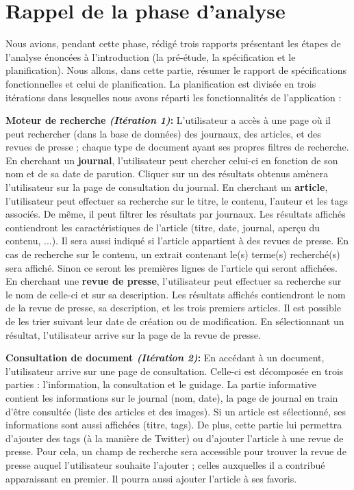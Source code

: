 \section{Rappel de la phase d'analyse}
\label{sec:rappel}

	Nous avions, pendant cette phase, rédigé trois rapports présentant les étapes de l'analyse énoncées à l'introduction (la pré-étude\cite{Pretude}, la spécification\cite{Specs} et le planification\cite{Planif}). Nous allons, dans cette partie, résumer le rapport de spécifications fonctionnelles et celui de planification. La planification est  divisée en trois itérations dans lesquelles nous avons réparti les fonctionnalités de l'application : 

	\textbf{Moteur de recherche \textit{(Itération 1)}:} L'utilisateur a accès à une page où il peut rechercher (dans la base de données) des journaux, des articles, et des revues de presse ; chaque type de document ayant ses propres filtres de recherche. 
	En cherchant un \textbf{journal}, l'utilisateur peut chercher celui-ci en fonction de son nom et de sa date de parution. Cliquer sur un des résultats obtenus amènera l'utilisateur sur la page de consultation du journal. 
	En cherchant un \textbf{article}, l'utilisateur peut effectuer sa recherche sur le titre, le contenu, l'auteur et les tags associés. De même, il peut filtrer les résultats par journaux. Les résultats affichés contiendront les caractéristiques de l'article (titre, date, journal, aperçu du contenu, ...). Il sera aussi indiqué si l'article appartient à des revues de presse. 
	En cas de recherche sur le contenu, un extrait contenant le(s) terme(s) recherché(s) sera affiché. Sinon ce seront les premières lignes de l'article qui seront affichées. En cherchant une \textbf{revue de presse}, l'utilisateur peut effectuer sa recherche sur le nom de celle-ci et sur sa description. Les résultats affichés contiendront le nom de la revue de presse, sa description, et les trois premiers articles. Il est possible de les trier suivant leur date de création ou de modification. En sélectionnant un résultat, l'utilisateur arrive sur la page de la revue de presse. 

	\textbf{Consultation de document \textit{(Itération 2)}:} En accédant à  un document, l'utilisateur arrive sur une page de consultation. Celle-ci est décomposée en trois parties : l'information, la consultation et le guidage. La partie informative contient les informations sur le journal (nom, date), la page de journal en train d'être consultée (liste des articles et des images). Si un article est sélectionné, ses informations sont aussi affichées (titre, tags). De plus, cette partie lui permettra d'ajouter des tags (à  la manière de Twitter) ou d'ajouter l'article à une revue de presse. Pour cela, un champ de recherche sera accessible pour trouver la revue de presse auquel l'utilisateur souhaite l'ajouter ; celles auxquelles il a contribué apparaissant en premier. Il pourra aussi ajouter l'article à ses favoris. 

